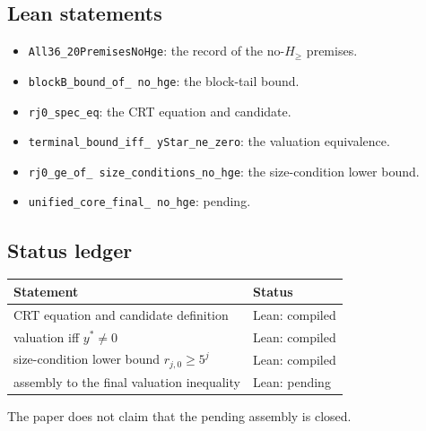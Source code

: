 \subsection{Lean statements}

\begin{itemize}[leftmargin=*]
\item \texttt{All36\_\allowbreak 20PremisesNoHge}: the record of the
  no-$H_{\ge}$ premises.
\item \texttt{blockB\_\allowbreak bound\_\allowbreak of\_\allowbreak
  no\_\allowbreak hge}: the block-tail bound.
\item \texttt{rj0\_\allowbreak spec\_\allowbreak eq}: the CRT equation
  and candidate.
\item \texttt{terminal\_\allowbreak bound\_\allowbreak iff\_\allowbreak
  yStar\_\allowbreak ne\_\allowbreak zero}: the valuation equivalence.
\item \texttt{rj0\_\allowbreak ge\_\allowbreak of\_\allowbreak
  size\_\allowbreak conditions\_\allowbreak no\_\allowbreak hge}: the
  size-condition lower bound.
\item \texttt{unified\_\allowbreak core\_\allowbreak final\_\allowbreak
  no\_\allowbreak hge}: pending.
\end{itemize}

\subsection{Status ledger}

\begin{center}
\small
\begin{tabular}{@{}ll@{}}
\toprule
Statement & Status \\
\midrule
CRT equation and candidate definition & Lean: compiled \\
valuation iff $y^*\ne0$ & Lean: compiled \\
size-condition lower bound $r_{j,0}\ge5^j$ & Lean: compiled \\
assembly to the final valuation inequality & Lean: pending \\
\bottomrule
\end{tabular}
\end{center}

The paper does not claim that the pending assembly is closed.
